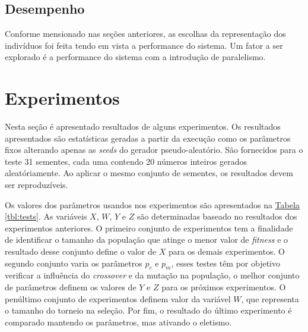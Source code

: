 \documentclass[a4paper]{paper}
\begin{document}
\subsection{Desempenho}

Conforme mensionado nas seções anteriores, as escolhas da representação dos
indivíduos foi feita tendo em vista a performance do sistema. Um fator a ser
explorado é a performance do sistema com a introdução de paralelismo.

\section{Experimentos}
Nesta seção é apresentado resultados de alguns experimentos. Os resultados
apresentados são estatísticas geradas a partir da execução como os parâmetros
fixos alterando apenas as \textit{seeds} do gerador pseudo-aleatório. São
fornecidos para o teste 31 sementes, cada uma contendo 20 números inteiros
gerados aleatóriamente.  Ao aplicar o mesmo conjunto de sementes, os resultados
devem ser reproduzíveis.

Os valores dos parâmetros usandos nos experimentos são apresentados na
\hyperref[tbl:tests]{Tabela \ref*{tbl:tests}}. As variáveis $X$, $W$, $Y$ e $Z$
são determinadas baseado no resultados dos experimentos anteriores. O primeiro
conjunto de experimentos tem a finalidade de identificar o tamanho da população
que atinge o menor valor de \textit{fitness} e o resultado desse conjunto define
o valor de $X$ para os demais experimentos. O segundo conjunto varia os
parâmetros $p_c$ e $p_m$, esses testes têm por objetivo verificar a influência
do \textit{crossover} e da mutação na população, o melhor conjunto de parâmetros
definem os valores de $Y$ e $Z$ para os próximos experimentos. O penúltimo
conjunto de experimentos definem valor da variável $W$, que representa o tamanho
do torneio na seleção. Por fim, o resultado do último experimento é comparado
mantendo os parâmetros, mas ativando o eletismo.
\end{document}
